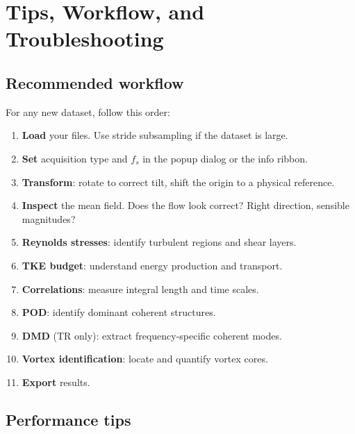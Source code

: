 \documentclass[11pt, a4paper]{report}
\begin{document}
\chapter{Tips, Workflow, and Troubleshooting}

\section{Recommended workflow}

For any new dataset, follow this order:

\begin{enumerate}[leftmargin=1.5em]
  \item \textbf{Load} your files. Use stride subsampling if the dataset is large.
  \item \textbf{Set} acquisition type and $f_s$ in the popup dialog or the info ribbon.
  \item \textbf{Transform}: rotate to correct tilt, shift the origin to a physical reference.
  \item \textbf{Inspect} the mean field. Does the flow look correct? Right direction, sensible magnitudes?
  \item \textbf{Reynolds stresses}: identify turbulent regions and shear layers.
  \item \textbf{TKE budget}: understand energy production and transport.
  \item \textbf{Correlations}: measure integral length and time scales.
  \item \textbf{POD}: identify dominant coherent structures.
  \item \textbf{DMD} (TR only): extract frequency-specific coherent modes.
  \item \textbf{Vortex identification}: locate and quantify vortex cores.
  \item \textbf{Export} results.
\end{enumerate}

\section{Performance tips}
\end{document}
